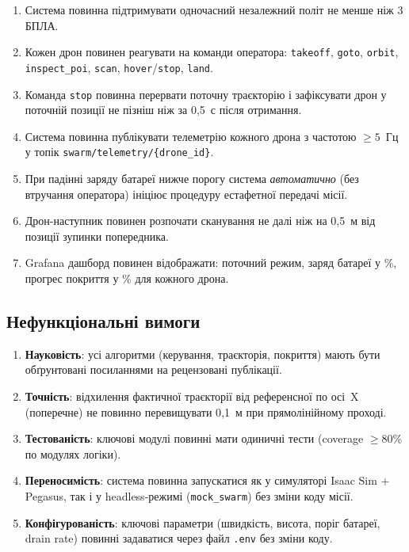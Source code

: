 \begin{enumerate}[label=\textbf{ФВ-\arabic*}., itemsep=4pt]
  \item Система повинна підтримувати одночасний незалежний політ не менше ніж 3 БПЛА.
  \item Кожен дрон повинен реагувати на команди оператора: \texttt{takeoff}, \texttt{goto}, \texttt{orbit}, \texttt{inspect\_poi}, \texttt{scan}, \texttt{hover}/\texttt{stop}, \texttt{land}.
  \item Команда \texttt{stop} повинна перервати поточну траєкторію і зафіксувати дрон у поточній позиції не пізніш ніж за 0{,}5~с після отримання.
  \item Система повинна публікувати телеметрію кожного дрона з частотою $\geq 5$~Гц у топік \texttt{swarm/telemetry/\{drone\_id\}}.
  \item При падінні заряду батареї нижче порогу система \emph{автоматично} (без втручання оператора) ініціює процедуру естафетної передачі місії.
  \item Дрон-наступник повинен розпочати сканування не далі ніж на 0{,}5~м від позиції зупинки попередника.
  \item Grafana дашборд повинен відображати: поточний режим, заряд батареї у \%, прогрес покриття у \% для кожного дрона.
\end{enumerate}

\subsection{Нефункціональні вимоги}

\begin{enumerate}[label=\textbf{НВ-\arabic*}., itemsep=4pt]
  \item \textbf{Науковість}: усі алгоритми (керування, траєкторія, покриття) мають бути обґрунтовані посиланнями на рецензовані публікації.
  \item \textbf{Точність}: відхилення фактичної траєкторії від референсної по осі~X (поперечне) не повинно перевищувати 0{,}1~м при прямолінійному проході.
  \item \textbf{Тестованість}: ключові модулі повинні мати одиничні тести (coverage $\geq 80$\% по модулях логіки).
  \item \textbf{Переносимість}: система повинна запускатися як у симуляторі Isaac Sim + Pegasus, так і у headless-режимі (\texttt{mock\_swarm}) без зміни коду місії.
  \item \textbf{Конфігурованість}: ключові параметри (швидкість, висота, поріг батареї, drain rate) повинні задаватися через файл \texttt{.env} без зміни коду.
\end{enumerate}

